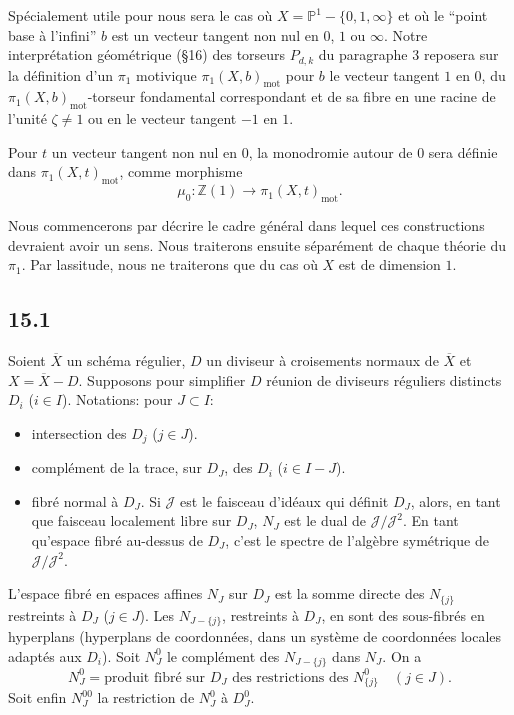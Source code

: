 \documentclass[12pt,a4paper]{article}
\theoremstyle{plain}
\theoremstyle{definition}
\theoremstyle{remark}
\newcommand{\bZ}{\mathbb{Z}}
\newcommand{\bP}{\mathbb{P}}
\newcommand{\mot}{\mathrm{mot}}
\begin{document}
Spécialement utile pour nous sera le cas où $X = \bP^1 - \{0, 1, \infty\}$ et où le ``point base à l'infini'' $b$ est un vecteur tangent non nul en $0$, $1$ ou $\infty$. Notre interprétation géométrique (§16) des torseurs $P_{d,k}$ du paragraphe 3 reposera sur la définition d'un $\pi_1$ motivique $\pi_1(X, b)_{\mot}$ pour $b$ le vecteur tangent $1$ en $0$, du $\pi_1(X, b)_{\mot}$-torseur fondamental correspondant et de sa fibre en une racine de l'unité $\zeta \neq 1$ ou en le vecteur tangent $-1$ en $1$.

Pour $t$ un vecteur tangent non nul en $0$, la monodromie autour de $0$ sera définie dans $\pi_1(X, t)_{\mot}$, comme morphisme
\[
\mu_0 : \bZ(1) \to \pi_1(X, t)_{\mot}.
\]

Nous commencerons par décrire le cadre général dans lequel ces constructions devraient avoir un sens. Nous traiterons ensuite séparément de chaque théorie du $\pi_1$. Par lassitude, nous ne traiterons que du cas où $X$ est de dimension $1$.

\subsection*{15.1}

Soient $\overline{X}$ un schéma régulier, $D$ un diviseur à croisements normaux de $\overline{X}$ et $X = \overline{X} - D$. Supposons pour simplifier $D$ réunion de diviseurs réguliers distincts $D_i$ ($i \in I$). Notations: pour $J \subset I$:
\begin{itemize}[nosep]
\item[$D_J$:] intersection des $D_j$ ($j \in J$).
\item[$D_J^0$:] complément de la trace, sur $D_J$, des $D_i$ ($i \in I - J$).
\item[$N_J$:] fibré normal à $D_J$. Si $\mathcal{J}$ est le faisceau d'idéaux qui définit $D_J$, alors, en tant que faisceau localement libre sur $D_J$, $N_J$ est le dual de $\mathcal{J}/\mathcal{J}^2$. En tant qu'espace fibré au-dessus de $D_J$, c'est le spectre de l'algèbre symétrique de $\mathcal{J}/\mathcal{J}^2$.
\end{itemize}

L'espace fibré en espaces affines $N_J$ sur $D_J$ est la somme directe des $N_{\{j\}}$ restreints à $D_J$ ($j \in J$). Les $N_{J-\{j\}}$, restreints à $D_J$, en sont des sous-fibrés en hyperplans (hyperplans de coordonnées, dans un système de coordonnées locales adaptés aux $D_i$). Soit $N_J^0$ le complément des $N_{J-\{j\}}$ dans $N_J$. On a
\begin{equation}\label{eq:15.1.1}
N_J^0 = \text{produit fibré sur } D_J \text{ des restrictions des } N_{\{j\}}^0 \quad (j \in J).
\end{equation}
Soit enfin $N_J^{00}$ la restriction de $N_J^0$ à $D_J^0$.
\end{document}
